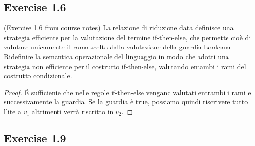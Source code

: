 \documentclass[12pt,a4paper,oneside]{book}
\begin{document}
\subsection{Exercise 1.6}

\begin{exercise}{(Exercise 1.6 from course notes)}
	La relazione di riduzione data definisce una strategia efficiente per la valutazione del termine if-then-else, che permette cioè di valutare unicamente il ramo scelto dalla valutazione della guardia booleana. Ridefinire la semantica operazionale del linguaggio in modo che adotti una strategia non efficiente per il costrutto if-then-else, valutando entambi i rami del costrutto condizionale.
	
	\begin{proof}
		\'E sufficiente che nelle regole if-then-else vengano valutati entrambi i rami e successivamente la guardia. Se la guardia è true, possiamo quindi riscrivere tutto l'ite a $v_1$ altrimenti verrà riscritto in $v_2$.
	\end{proof}
\end{exercise}

\subsection{Exercise 1.9}
\end{document}
